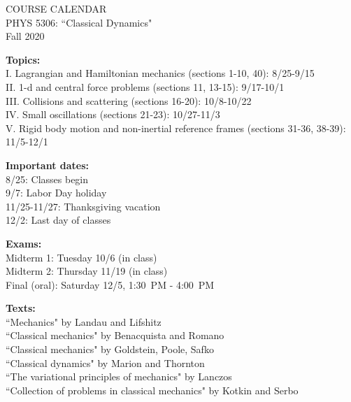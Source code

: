 \documentclass[11pt]{NSF}
\begin{document}
\begin{center}
COURSE CALENDAR\\
PHYS 5306: ``Classical Dynamics"\\
Fall 2020\\
\end{center}

{\bf Topics:}\\
I. Lagrangian and Hamiltonian mechanics (sections 1-10,  40):
8/25-9/15\\
II. 1-d and central force problems (sections 11, 13-15): 9/17-10/1\\
III. Collisions and scattering (sections 16-20): 10/8-10/22\\
IV. Small oscillations (sections 21-23): 10/27-11/3\\
V. Rigid body motion and non-inertial reference frames (sections
31-36, 38-39): 11/5-12/1

{\bf Important dates:}\\
8/25: Classes begin\\
9/7: Labor Day holiday\\
11/25-11/27: Thanksgiving vacation\\
12/2: Last day of classes

{\bf Exams:}\\
Midterm 1: Tuesday 10/6 (in class)\\
Midterm 2: Thursday 11/19 (in class)\\
Final (oral): Saturday 12/5, 1:30~PM - 4:00~PM

{\bf Texts:}\\
``Mechanics" by Landau and Lifshitz\\
``Classical mechanics" by Benacquista and Romano\\
``Classical mechanics" by Goldstein, Poole, Safko\\
``Classical dynamics" by Marion and Thornton\\
``The variational principles of mechanics" by Lanczos\\
``Collection of problems in classical mechanics" by Kotkin and Serbo\\
\end{document}

